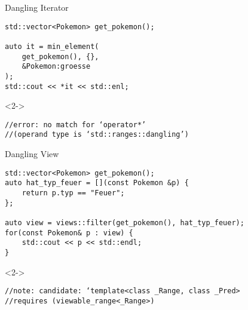 \begin{frame}[fragile]{Dangling Iterator}
    \begin{overlayarea}{\linewidth}{6cm}
        \begin{verbatim}
std::vector<Pokemon> get_pokemon();

auto it = min_element(
    get_pokemon(), {},
    &Pokemon:groesse
);
std::cout << *it << std::enl;
    \end{verbatim}
        \begin{onlyenv}<2->
            \begin{verbatim}
//error: no match for ‘operator*’
//(operand type is ‘std::ranges::dangling’)
            \end{verbatim}
        \end{onlyenv}
    \end{overlayarea}
\end{frame}



\begin{frame}[fragile]{Dangling View}
    \begin{overlayarea}{\linewidth}{6cm}
        \begin{verbatim}
std::vector<Pokemon> get_pokemon();
auto hat_typ_feuer = [](const Pokemon &p) { 
    return p.typ == "Feuer";
};

auto view = views::filter(get_pokemon(), hat_typ_feuer);
for(const Pokemon& p : view) {
    std::cout << p << std::endl;
}
    \end{verbatim}
        \begin{onlyenv}<2->
            \begin{verbatim}
//note: candidate: ‘template<class _Range, class _Pred>
//requires (viewable_range<_Range>)
            \end{verbatim}
        \end{onlyenv}
    \end{overlayarea}

\end{frame}


